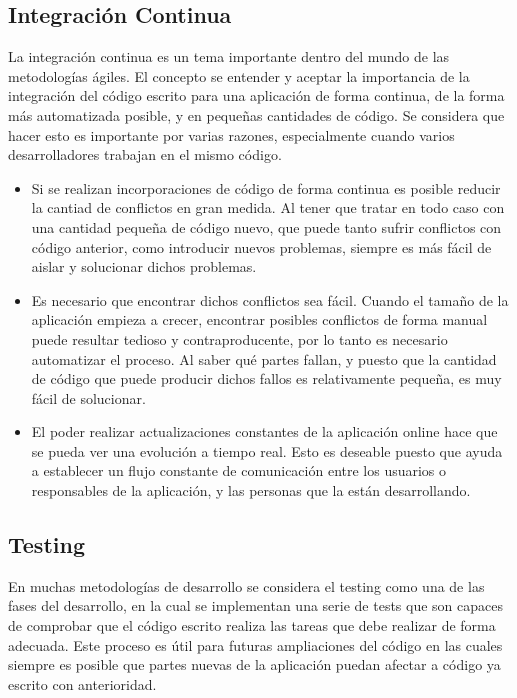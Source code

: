 
\subsection{Integración Continua} %
\label{sub:ic}

La integración continua es un tema importante dentro del mundo de las metodologías ágiles. El concepto se entender y aceptar la importancia de la integración del código escrito para una aplicación de forma continua, de la forma más automatizada posible, y en pequeñas cantidades de código. Se considera que hacer esto es importante por varias razones, especialmente cuando varios desarrolladores trabajan en el mismo código.

\begin{itemize}
	\item Si se realizan incorporaciones de código de forma continua es posible reducir la cantiad de conflictos en gran medida. Al tener que tratar en todo caso con una cantidad pequeña de código nuevo, que puede tanto sufrir conflictos con código anterior, como introducir nuevos problemas, siempre es más fácil de aislar y solucionar dichos problemas.
	\item Es necesario que encontrar dichos conflictos sea fácil. Cuando el tamaño de la aplicación empieza a crecer, encontrar posibles conflictos de forma manual puede resultar tedioso y contraproducente, por lo tanto es necesario automatizar el proceso. Al saber qué partes fallan, y puesto que la cantidad de código que puede producir dichos fallos es relativamente pequeña, es muy fácil de solucionar.
	\item El poder realizar actualizaciones constantes de la aplicación online hace que se pueda ver una evolución a tiempo real. Esto es deseable puesto que ayuda a establecer un flujo constante de comunicación entre los usuarios o responsables de la aplicación, y las personas que la están desarrollando.
\end{itemize}


\subsection{Testing} %
\label{sub:testing}

En muchas metodologías de desarrollo se considera el testing como una de las fases del desarrollo, en la cual se implementan una serie de tests que son capaces de comprobar que el código escrito realiza las tareas que debe realizar de forma adecuada. Este proceso es útil para futuras ampliaciones del código en las cuales siempre es posible que partes nuevas de la aplicación puedan afectar a código ya escrito con anterioridad.

